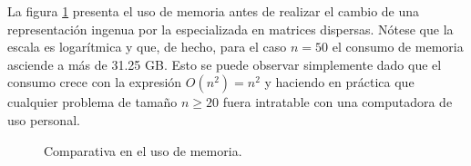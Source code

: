 La figura \ref{fig:uso-memoria} presenta el uso de memoria antes de realizar el cambio de una representación ingenua por la especializada en matrices dispersas. Nótese que la escala es logarítmica y que, de hecho, para el caso $n=50$ el consumo de memoria asciende a más de 31.25 GB. Esto se puede observar simplemente dado que el consumo crece con la expresión $O(n^2)=n^2$ y haciendo en práctica que cualquier problema de tamaño $n \geq 20$ fuera intratable con una computadora de uso personal.

\begin{figure}[h]
	\centering
	\pgfplotsset{width=8cm}
  \caption{Comparativa en el uso de memoria.}
  \label{fig:uso-memoria}
\end{figure}

